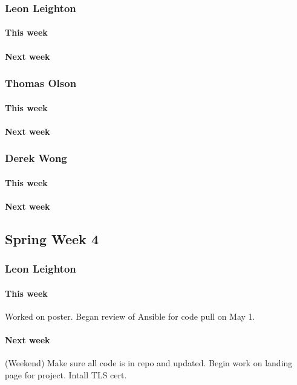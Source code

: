 \documentclass[10pt,letterpaper,onecolumn,draftclsnofoot]{IEEEtran}
\begin{document}
\subsubsection{Leon Leighton}
\paragraph{This week}
\paragraph{Next week}

\subsubsection{Thomas Olson}
\paragraph{This week}
\paragraph{Next week}

\subsubsection{Derek Wong}
\paragraph{This week}
\paragraph{Next week}


\subsection{Spring Week 4}
\subsubsection{Leon Leighton}
\paragraph{This week}Worked on poster.  
Began review of Ansible for code pull on May 1.
\paragraph{Next week}(Weekend) Make sure all code is in repo and updated.  
Begin work on landing page for project.  
Intall TLS cert.
\end{document}
